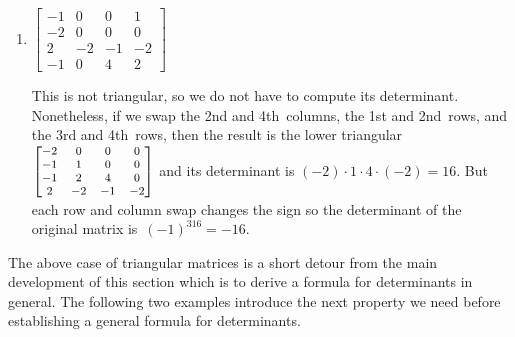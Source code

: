 \begin{example}
\begin{enumerate}
\item \(\begin{bmatrix}-1&0&0&1
\\-2&0&0&0
\\2&-2&-1&-2
\\-1&0&4&2\end{bmatrix}\)
\begin{solution} 
This is not triangular, so we do not have to compute its determinant. 
Nonetheless, if we swap the 2nd and 4th~columns, the 1st and 2nd~rows, and the 3rd and 4th~rows, then the result is the lower triangular \(\footnotesize\begin{bmatrix}-2&0&0&0
\\-1&1&0&0
\\-1&2&4&0
\\2&-2&-1&-2\end{bmatrix}\) and its determinant is \((-2)\cdot1\cdot4\cdot(-2)=16\). 
But each row and column swap changes the sign so the determinant of the original matrix is~\((-1)^316=-16\). 
\end{solution}
\end{enumerate}
\end{example}



The above case of triangular matrices is a short detour from the main development of this section which is to derive a formula for determinants in general.
The following two examples introduce the next property we need before establishing a general formula for determinants.


